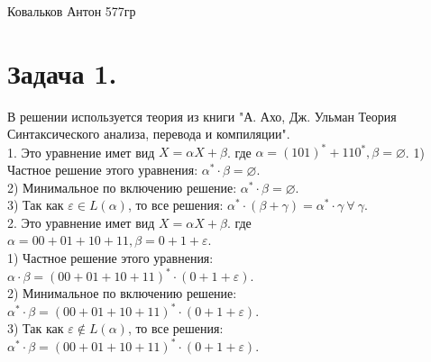 \documentclass[12pt]{article}
\theoremstyle{definition}
\theoremstyle{definition}
\let\eps\varepsilon
\begin{document}
\begin{center} {\LARGE Ковальков Антон 577гр} \end{center}
\section*{Задача  1.}
В решении используется теория из книги "А. Ахо, Дж. Ульман Теория Синтаксического анализа, перевода и компиляции".\\
1. Это уравнение имет вид $X = \alpha X + \beta$. где $\alpha = (101)^*+110^*, \beta = \varnothing$.
\hspace*{1cm}1) Частное решение этого уравнения: $\alpha^* \cdot \beta = \varnothing.$\\
\hspace*{1cm}2) Минимальное по включению решение: $\alpha^* \cdot \beta = \varnothing.$\\
\hspace*{1cm}3) Так как $\eps \in L(\alpha)$, то все решения: $\alpha^* \cdot (\beta + \gamma) = \alpha^* \cdot \gamma\  \forall\ \gamma.$\\

2.  Это уравнение имет вид $X = \alpha X + \beta$. где\\ \hspace*{1,5cm}
 $\alpha = 00 + 01 + 10 + 11, \beta = 0 + 1 + \eps$. \\
\hspace*{1cm}1) Частное решение этого уравнения:\\ \hspace*{1,5cm}$\alpha \cdot \beta = (00 + 01 + 10 + 11)^*\cdot (0 + 1 + \eps).$\\
\hspace*{1cm}2) Минимальное по включению решение:\\ \hspace*{1,5cm}$\alpha^* \cdot \beta = (00 + 01 + 10 + 11)^*\cdot (0 + 1 + \eps).$\\
\hspace*{1cm}3) Так как $\eps \notin L(\alpha)$, то все решения:\\ \hspace*{1,5cm}$\alpha^* \cdot \beta = (00 + 01 + 10 + 11)^*\cdot (0 + 1 + \eps).$\\
\end{document}
